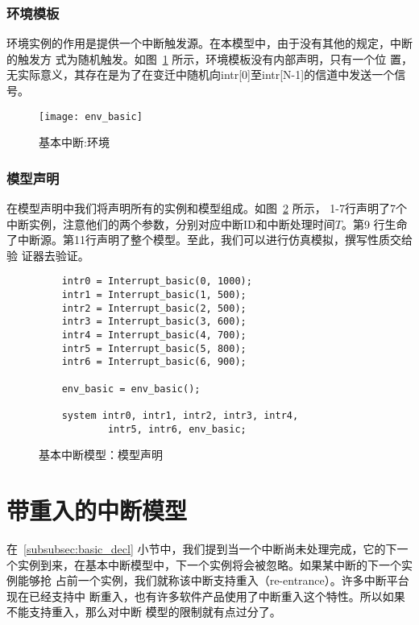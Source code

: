 \subsubsection{环境模板}
\label{subsubsec:basic_env}

环境实例的作用是提供一个中断触发源。在本模型中，由于没有其他的规定，中断的触发方
式为随机触发。如图~\ref{fig:evn_basic} 所示，环境模板没有内部声明，只有一个位
置，无实际意义，其存在是为了在变迁中随机向intr[0]至intr[N-1]的信道中发送一个信
号。

\begin{figure}[H]
	\centering
	\texttt{[image: env\_basic]}
	\caption{基本中断:环境}
	\label{fig:evn_basic}
\end{figure}

\subsubsection{模型声明}
\label{subsubsec:basic_model_decl}

在模型声明中我们将声明所有的实例和模型组成。如图~\ref{fig:basic_model_decl} 所示，
1-7行声明了7个中断实例，注意他们的两个参数，分别对应中断ID和中断处理时间$T$。第9
行生命了中断源。第11行声明了整个模型。至此，我们可以进行仿真模拟，撰写性质交给验
证器去验证。

\begin{figure}[H]
	\centering
	\begin{lstlisting}
	intr0 = Interrupt_basic(0, 1000);
	intr1 = Interrupt_basic(1, 500);
	intr2 = Interrupt_basic(2, 500);
	intr3 = Interrupt_basic(3, 600);
	intr4 = Interrupt_basic(4, 700);
	intr5 = Interrupt_basic(5, 800);
	intr6 = Interrupt_basic(6, 900);
	
	env_basic = env_basic();
	
	system intr0, intr1, intr2, intr3, intr4, 
			intr5, intr6, env_basic;
	\end{lstlisting}
	\caption{基本中断模型：模型声明}
	\label{fig:basic_model_decl}
\end{figure}

\section{带重入的中断模型}
\label{sec:reentrant}

在~\ref{subsubsec:basic_decl} 小节中，我们提到当一个中断尚未处理完成，它的下一
个实例到来，在基本中断模型中，下一个实例将会被忽略。如果某中断的下一个实例能够抢
占前一个实例，我们就称该中断支持重入（re-entrance）。许多中断平台现在已经支持中
断重入，也有许多软件产品使用了中断重入这个特性。所以如果不能支持重入，那么对中断
模型的限制就有点过分了。

